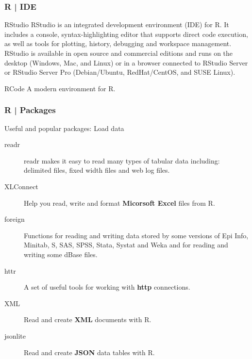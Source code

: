 \begin{frame}
  \frametitle{R | IDE}
  \begin{block}{\alert{RStudio}}
 RStudio is an integrated development environment (IDE) for R. It includes a console, syntax-highlighting editor that supports direct code execution, as well as tools for plotting, history, debugging and workspace management.\\
 \vspace{0.3em}
 RStudio is available in open source and commercial editions and runs on the desktop (Windows, Mac, and Linux) or in a browser connected to RStudio Server or RStudio Server Pro (Debian/Ubuntu, RedHat/CentOS, and SUSE Linux).
  \end{block}
  \pause
  \begin{block}{RCode}
    A modern environment for R.
  \end{block}
\end{frame}

\begin{frame}
  \frametitle{R | Packages}
  \begin{block}{Useful and popular packages: Load data}
    \begin{description}
      \item[\alert{readr}] readr makes it easy to read many types of \alert{tabular data} including: delimited files, fixed width files and web log files.
      \item[XLConnect] Help you read, write and format \textbf{Micorsoft Excel} files from R.
      \item[foreign] Functions for reading and writing data stored by some versions of Epi Info, Minitab, S, SAS, SPSS, Stata, Systat and Weka and for reading and writing some dBase files.
      \item[httr] A set of useful tools for working with \textbf{http} connections.
      \item[XML] Read and create \textbf{XML} documents with R.
      \item[jsonlite] Read and create \textbf{JSON} data tables with R.
    \end{description}
  \end{block}
\end{frame}

